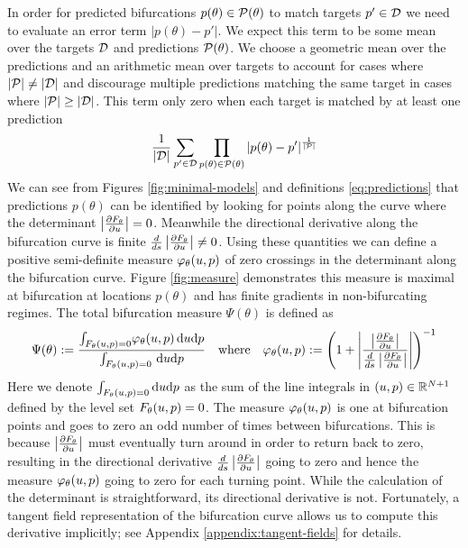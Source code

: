 In order for predicted bifurcations $p(\theta)\in\mathcal{P}(\theta)$ to match targets $p'\in\mathcal{D}$ we need to evaluate an error term $|p(\theta)-p'|$. We expect this term to be some mean over the targets $\mathcal{D}$ and predictions $\mathcal{P}(\theta)$. We choose a geometric mean over the predictions and an arithmetic mean over targets to account for cases where $|\mathcal{P}|\neq|\mathcal{D}|$ and discourage multiple predictions matching the same target in cases where $|\mathcal{P}|\geq|\mathcal{D}|$. This term only zero when each target is matched by at least one prediction
\begin{align}
    \frac{1}{|\mathcal{D}|}\sum_{p'\in\mathcal{D}}
    \prod_{p(\theta)\in\mathcal{P}(\theta)}|p(\theta)-p'|
    ^{\frac{1}{|\mathcal{P}|}}
    \label{eq:error}
\end{align}
We can see from Figures \ref{fig:minimal-models} and definitions \eqref{eq:predictions} that predictions $p(\theta)$ can be identified by looking for points along the curve where the determinant $\left| \frac{\partial F_{\theta}}{\partial u} \right|=0$. Meanwhile the directional derivative along the bifurcation curve is finite $\frac{d}{ds}\left| \frac{\partial F_{\theta}}{\partial u} \right|\neq 0$. Using these quantities we can define a positive semi-definite measure $\varphi_{\theta}(u,p)$ of zero crossings in the determinant along the bifurcation curve. Figure \ref{fig:measure} demonstrates this measure is maximal at bifurcation at locations $p(\theta)$ and has finite gradients in non-bifurcating regimes. The total bifurcation measure $\Psi(\theta)$ is defined as
\begin{align}
    \Psi(\theta):=\frac{
        \int_{F_{\theta}(u,p)=0}\!
        \varphi_{\theta}(u,p)\,\mathrm{d}u\mathrm{d}p
    }{
        \int_{F_{\theta}(u,p)=0}\!\
        \mathrm{d}u\mathrm{d}p
    }
    \quad\mathrm{where}\quad
    \varphi_{\theta}(u,p):=
    \left(1+\left|\frac{\left| \frac{\partial F_{\theta}}{\partial u} \right|}{\frac{d}{ds}\left| \frac{\partial F_{\theta}}{\partial u} \right|}\right|\right)^{-1}
    \label{eq:measure}
\end{align}
Here we denote $\int_{F_{\theta}(u,p)=0}\mathrm{d}u\mathrm{d}p$ as the sum of the line integrals in $(u,p)\in\mathbb{R}^{N+1}$ defined by the level set $F_{\theta}(u,p)=0$. The measure $\varphi_{\theta}(u,p)$ is one at bifurcation points and goes to zero an odd number of times between bifurcations. This is because $\left| \frac{\partial F_{\theta}}{\partial u} \right|$ must eventually turn around in order to return back to zero, resulting in the directional derivative $\frac{d}{ds}\left| \frac{\partial F_{\theta}}{\partial u} \right|$ going to zero and hence the measure $\varphi_{\theta}(u,p)$ going to zero for each turning point. While the calculation of the determinant is straightforward, its directional derivative is not. Fortunately, a tangent field representation of the bifurcation curve allows us to compute this derivative implicitly; see Appendix \ref{appendix:tangent-fields} for details.

